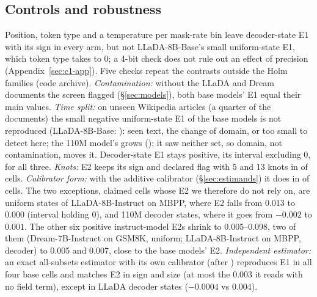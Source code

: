 \subsection{Controls and robustness}
\label{sec:c1-t8}
\label{sec:c1-robust}

Position, token type and a temperature per mask-rate bin leave decoder-state E1 with its
sign in every arm, but not LLaDA-8B-Base's small uniform-state E1, which token type takes
to 0; a 4-bit check does not rule out an effect of precision (Appendix~\ref{sec:c1-app}). Five checks repeat the contrasts outside the Holm families
(code archive).
\emph{Contamination:} without the \VivaLladaContamFlagged{} LLaDA and \VivaDreamContamFlagged{}
Dream documents the screen flagged (\S\ref{sec:models}), both base models' E1 equal their main
values.
\emph{Time split:} on unseen Wikipedia articles (a quarter of the documents) the small negative
uniform-state E1 of the base models is not reproduced (LLaDA-8B-Base:
): seen text, the change of domain, or too small to
detect here; the 110M model's grows (); it saw neither set, so
domain, not contamination, moves it. Decoder-state E1 stays positive, its interval excluding 0, for all three.
\emph{Knots:} E2 keeps its sign and declared flag with 5 and 13 knots in  of
 cells.
\emph{Calibrator form:} with the additive calibrator (\S\ref{sec:estimands}) it does in
 of  cells. The two exceptions, claimed cells whose E2
we therefore do not rely on, are uniform states of LLaDA-8B-Instruct on MBPP, where E2 falls from
0.013 to 0.000 (interval holding 0), and 110M decoder states, where it goes from $-0.002$ to $0.001$. The other six
positive instruct-model E2s shrink to 0.005--0.098, two of them (Dream-7B-Instruct on GSM8K,
uniform; LLaDA-8B-Instruct on MBPP, decoder) to 0.005 and 0.007, close to the base models' E2.
\emph{Independent estimator:}
an exact all-subsets estimator with its own calibrator (after \citealt{dorigo2026greedy})
reproduces E1 in all four base cells and matches E2 in sign and size (at most the $0.003$ it reads
with no field term), except in LLaDA decoder states ($-0.0004$ vs $0.004$).
